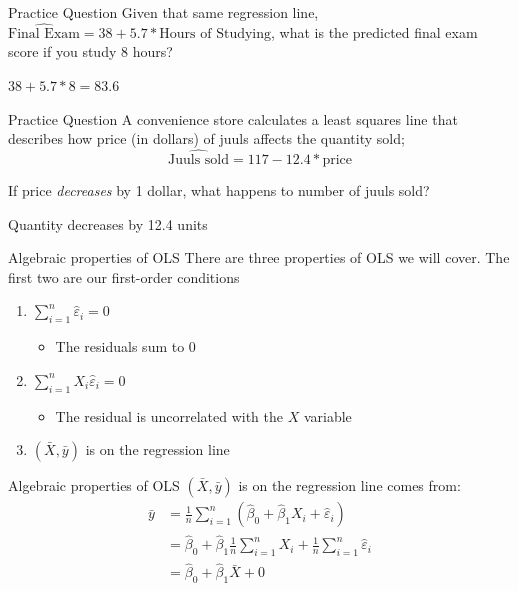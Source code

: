 \documentclass[aspectratio=169,t,11pt,table]{beamer}
\begin{document}
\begin{frame}{Practice Question}
  Given that same regression line, $\widehat{\text{Final Exam}} = 38 + 5.7 * \text{Hours of Studying}$, what is the predicted final exam score if you study 8 hours?

  \pause 
  $38 + 5.7 * 8 = 83.6$
\end{frame}

\begin{frame}{Practice Question}
  A convenience store calculates a least squares line that describes how price (in dollars) of juuls affects the quantity sold; 
  $$
    \widehat{\text{Juuls sold}} = 117 - 12.4 * \text{price}
  $$ 

  If price \emph{decreases} by 1 dollar, what happens to number of juuls sold?

  \pause
  Quantity decreases by 12.4 units
\end{frame}



\begin{frame}{Algebraic properties of OLS}
  There are three properties of OLS we will cover. The first two are our first-order conditions
  \begin{enumerate}
    \item $\sum_{i=1}^n \hat{\varepsilon}_i = 0$
    \begin{itemize}
      \item The residuals sum to $0$
    \end{itemize}

    \pause
    \medskip
    \item $\sum_{i=1}^n X_i \hat{\varepsilon}_i = 0$
    \begin{itemize}
      \item The residual is uncorrelated with the $X$ variable
    \end{itemize}
    
    \pause
    \medskip
    \item $(\bar{X}, \bar{y})$ is on the regression line
  \end{enumerate}
\end{frame}

\begin{frame}{Algebraic properties of OLS}
  $(\bar{X}, \bar{y})$ is on the regression line comes from:
  \begin{align*}
    \bar{y} &= \frac{1}{n} \sum_{i=1}^n (\hat{\beta}_0 + \hat{\beta}_1 X_i + \hat{\varepsilon}_i) \\
    &= \hat{\beta}_0 + \hat{\beta}_1 \frac{1}{n} \sum_{i=1}^n X_i + \frac{1}{n} \sum_{i=1}^n \hat{\varepsilon}_i \\
    &= \hat{\beta}_0 + \hat{\beta}_1 \bar{X} + 0 \\
  \end{align*}
\end{frame}
\end{document}
